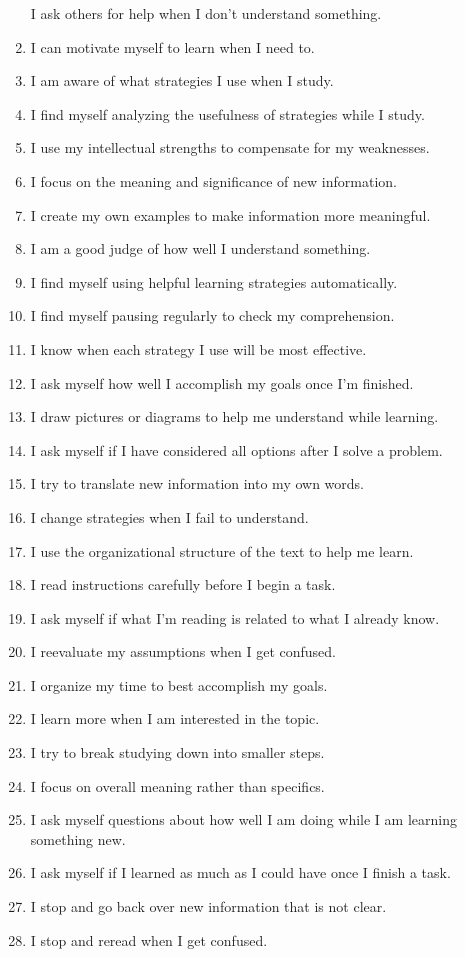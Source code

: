 \documentclass[letterpaper, nobind]{templates/ociamthesis}
\begin{document}
\begin{enumerate}
  I ask others for help when I don't understand something.
\item
  I can motivate myself to learn when I need to.
\item
  I am aware of what strategies I use when I study.
\item
  I find myself analyzing the usefulness of strategies while I study.
\item
  I use my intellectual strengths to compensate for my weaknesses.
\item
  I focus on the meaning and significance of new information.
\item
  I create my own examples to make information more meaningful.
\item
  I am a good judge of how well I understand something.
\item
  I find myself using helpful learning strategies automatically.
\item
  I find myself pausing regularly to check my comprehension.
\item
  I know when each strategy I use will be most effective.
\item
  I ask myself how well I accomplish my goals once I'm finished.
\item
  I draw pictures or diagrams to help me understand while learning.
\item
  I ask myself if I have considered all options after I solve a problem.
\item
  I try to translate new information into my own words.
\item
  I change strategies when I fail to understand.
\item
  I use the organizational structure of the text to help me learn.
\item
  I read instructions carefully before I begin a task.
\item
  I ask myself if what I'm reading is related to what I already know.
\item
  I reevaluate my assumptions when I get confused.
\item
  I organize my time to best accomplish my goals.
\item
  I learn more when I am interested in the topic.
\item
  I try to break studying down into smaller steps.
\item
  I focus on overall meaning rather than specifics.
\item
  I ask myself questions about how well I am doing while I am learning something new.
\item
  I ask myself if I learned as much as I could have once I finish a task.
\item
  I stop and go back over new information that is not clear.
\item
  I stop and reread when I get confused.
\end{enumerate}
\end{document}
